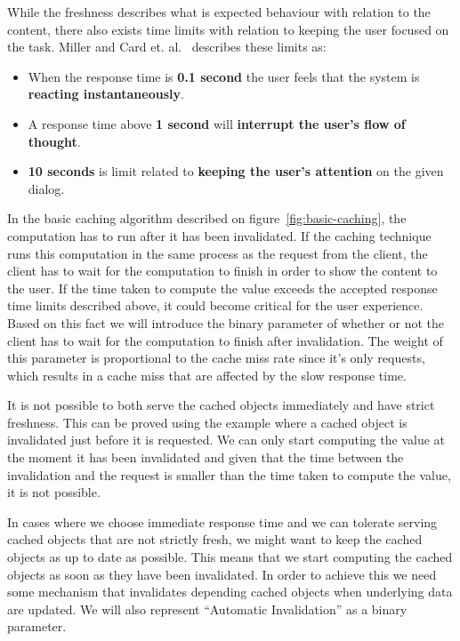 
While the freshness describes what is expected behaviour with relation to the content, there also exists time limits with relation to keeping the user focused on the task. Miller and Card et. al.~\cite{paper:miller-response-time-limit, paper:card-response-time-limit} describes these limits as:

\begin{itemize}
  \item When the response time is \textbf{0.1 second} the user feels that the system is \textbf{reacting instantaneously}.
  \item A response time above \textbf{1 second} will \textbf{interrupt the user's flow of thought}.
  \item \textbf{10 seconds} is limit related to \textbf{keeping the user's attention} on the given dialog.
\end{itemize}

In the basic caching algorithm described on figure~\ref{fig:basic-caching}, the computation has to run after it has been invalidated. If the caching technique runs this computation in the same process as the request from the client, the client has to wait for the computation to finish in order to show the content to the user. If the time taken to compute the value exceeds the accepted response time limits described above, it could become critical for the user experience. Based on this fact we will introduce the binary parameter of whether or not the client has to wait for the computation to finish after invalidation. The weight of this parameter is proportional to the cache miss rate since it's only requests, which results in a cache miss that are affected by the slow response time.


It is not possible to both serve the cached objects immediately and have strict freshness. This can be proved using the example where a cached object is invalidated just before it is requested. We can only start computing the value at the moment it has been invalidated and given that the time between the invalidation and the request is smaller than the time taken to compute the value, it is not possible.

In cases where we choose immediate response time and we can tolerate serving cached objects that are not strictly fresh, we might want to keep the cached objects as up to date as possible. This means that we start computing the cached objects as soon as they have been invalidated. In order to achieve this we need some mechanism that invalidates depending cached objects when underlying data are updated. We will also represent ``Automatic Invalidation'' as a binary parameter.

